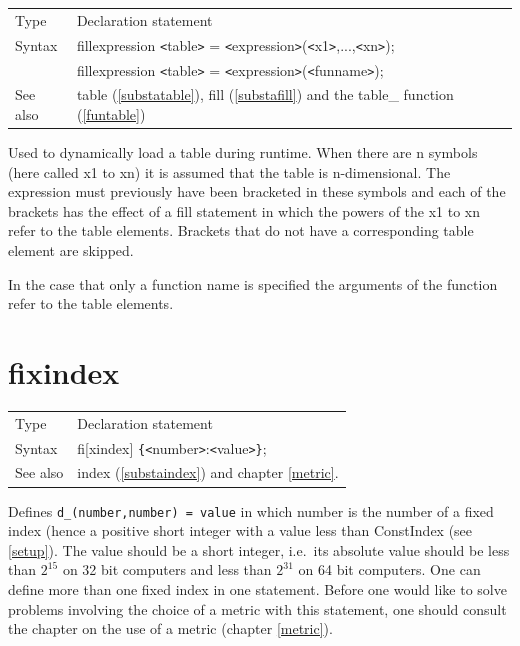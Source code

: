 \noindent \begin{tabular}{ll}
Type & Declaration statement\\
Syntax & fillexpression {\tt<}table{\tt>} = {\tt<}expression{\tt>}({\tt<}x1{\tt>},...,{\tt<}xn{\tt>});
\\     & fillexpression {\tt<}table{\tt>} = {\tt<}expression{\tt>}({\tt<}funname{\tt>});
\\ See also & table (\ref{substatable}), 
                fill (\ref{substafill}) and the table\_ function 
(\ref{funtable})
\end{tabular}\vspace{4mm}

\noindent Used to dynamically
load a table during runtime. When 
there are n symbols (here called x1 to xn) it is assumed that the table is 
n-dimensional. The expression must previously have been bracketed in these 
symbols and each of the brackets has the effect of a 
fill statement in which the powers of the x1 to xn refer to the 
table elements. Brackets that do not have a corresponding table element are 
skipped.

\noindent In the case that only a function name is specified the arguments 
of the function refer to the table elements.
\vspace{10mm}

 
\section{fixindex}
\label{substafixindex}

\noindent \begin{tabular}{ll}
Type & Declaration statement\\
Syntax & fi[xindex] \verb:{:{\tt<}number{\tt>}:{\tt<}value{\tt>}\verb:}:;
\\ See also & index (\ref{substaindex}) and chapter \ref{metric}.
\end{tabular} \vspace{4mm}

\noindent Defines \verb:d_(number,number) = value: in which number is the 
number of a fixed index 
(hence a positive short integer with a value less than 
ConstIndex (see \ref{setup}). The value should be a 
short integer, i.e.\ its absolute value should be less 
than $2^{15}$ on 32 bit computers and less than $2^{31}$ on 
64 bit 
computers. One can define more than one fixed index in one statement. 
Before one would like to solve problems involving the choice of a metric 
with this statement, one should consult the chapter on the use of a 
metric 
(chapter \ref{metric}).
\vspace{10mm}


